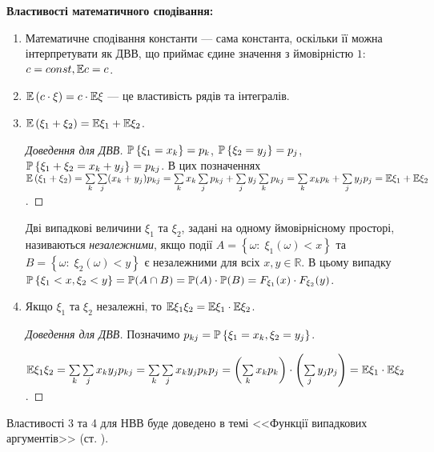 \vspace{0.5em}
\noindent \textbf{Властивості математичного сподівання:}
\begin{enumerate}
    \item Математичне сподівання константи --- сама константа, оскільки
    її можна інтерпретувати як ДВВ, що приймає єдине значення з ймовірністю $1$:
    $c = const, \E c = c$.
    \item $\E \left(c\cdot\xi\right) = c\cdot \E\xi$ --- це властивість рядів та інтегралів.
    \item $\E\left( \xi_1 + \xi_2\right) = \E\xi_1 + \E\xi_2$.
    \begin{proof}[Доведення для ДВВ]
        $\P\left\{\xi_1 = x_k\right\} = p_k$, $\P\left\{\xi_2 = y_j\right\} = p_j$, $\P\left\{\xi_1 + \xi_2 = x_k + y_j\right\} = p_{kj}$.
        В цих позначеннях
        $\E\left( \xi_1 + \xi_2\right) = \sum\limits_k \sum\limits_j (x_k+y_j) p_{kj} =
        \sum\limits_k x_k \sum\limits_j p_{kj} + \sum\limits_j y_j \sum\limits_k p_{kj} = \sum\limits_k x_k p_k + \sum\limits_j y_j p_j = \E\xi_1 + \E\xi_2$.
    \end{proof}
\begin{definition}
    Дві випадкові величини $\xi_1$ та $\xi_2$, задані на одному ймовірнісному просторі, називаються \emph{незалежними}, якщо
    події $A=\left\{\omega : \; \xi_1(\omega) < x\right\}$ та
    $B=\left\{\omega : \; \xi_2(\omega) < y\right\}$ є незалежними для всіх $x, y \in \mathbb{R}$.
    В цьому випадку $\P\left\{\xi_1 < x, \xi_2 < y\right\} = \P(A \cap B) = \P(A)\cdot \P(B) = F_{\xi_1}(x)\cdot F_{\xi_2}(y)$.
\end{definition}
    \item Якщо $\xi_1$ та $\xi_2$ незалежні, то $\E\xi_1\xi_2 = \E\xi_1 \cdot \E\xi_2$.
    \begin{proof}[Доведення для ДВВ]
        Позначимо $p_{kj} = \P\left\{\xi_1 = x_k, \xi_2 = y_j\right\}$.
        
        $\E\xi_1\xi_2 = \sum\limits_k \sum\limits_j x_k y_j p_{kj} = \sum\limits_k \sum\limits_j x_k y_j p_k p_j = \left( \sum\limits_k x_k p_k\right)\cdot \left( \sum\limits_j y_j p_j\right) = \E\xi_1 \cdot \E\xi_2$.
    \end{proof}
\end{enumerate}
\begin{remark}
    Властивості 3 та 4 для НВВ буде доведено в темі <<Функції випадкових аргументів>> (ст. \pageref{proof:expectation}).
\end{remark}

